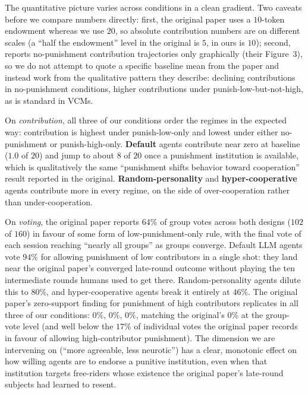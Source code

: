 \documentclass[12pt, a4paper]{article}
\begin{document}
The quantitative picture varies across conditions in a clean gradient. Two caveats before we compare numbers directly: first, the original paper uses a $10$-token endowment whereas we use $20$, so absolute contribution numbers are on different scales (a ``half the endowment'' level in the original is $5$, in ours is $10$); second, \citet{ertan2009who} reports no-punishment contribution trajectories only graphically (their Figure~3), so we do not attempt to quote a specific baseline mean from the paper and instead work from the qualitative pattern they describe: declining contributions in no-punishment conditions, higher contributions under punish-low-but-not-high, as is standard in VCMs.

On \emph{contribution}, all three of our conditions order the regimes in the expected way: contribution is highest under punish-low-only and lowest under either no-punishment or punish-high-only. \textbf{Default} agents contribute near zero at baseline ($1.0$ of $20$) and jump to about $8$ of $20$ once a punishment institution is available, which is qualitatively the same ``punishment shifts behavior toward cooperation'' result reported in the original. \textbf{Random-personality} and \textbf{hyper-cooperative} agents contribute more in every regime, on the side of over-cooperation rather than under-cooperation.

On \emph{voting}, the original paper reports $64\%$ of group votes across both designs ($102$ of $160$) in favour of some form of low-punishment-only rule, with the final vote of each session reaching ``nearly all groups'' as groups converge. Default LLM agents vote $94\%$ for allowing punishment of low contributors in a single shot: they land near the original paper's converged late-round outcome without playing the ten intermediate rounds humans used to get there. Random-personality agents dilute this to $80\%$, and hyper-cooperative agents break it entirely at $46\%$. The original paper's zero-support finding for punishment of high contributors replicates in all three of our conditions: $0\%$, $0\%$, $0\%$, matching the original's $0\%$ at the group-vote level (and well below the $17\%$ of individual votes the original paper records in favour of allowing high-contributor punishment). The dimension we are intervening on (``more agreeable, less neurotic'') has a clear, monotonic effect on how willing agents are to endorse a punitive institution, even when that institution targets free-riders whose existence the original paper's late-round subjects had learned to resent.
\end{document}
